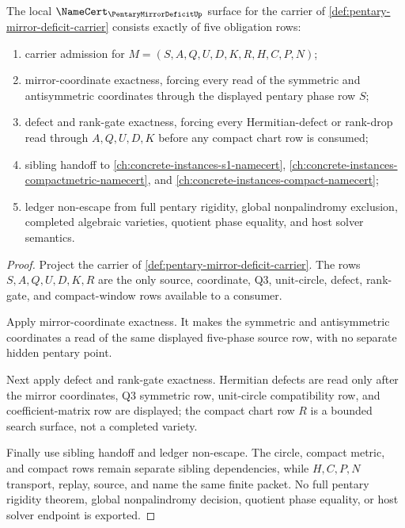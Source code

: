 \begin{theorem}
\label{thm:pentary-mirror-deficit-namecert-obligations}
The local $\NameCert_{\PentaryMirrorDeficitUp}$ surface for the carrier of \autoref{def:pentary-mirror-deficit-carrier} consists exactly of five obligation rows:
\begin{enumerate}
\item carrier admission for $M=(S,A,Q,U,D,K,R,H,C,P,N)$;
\item mirror-coordinate exactness, forcing every read of the symmetric and antisymmetric coordinates through the displayed pentary phase row $S$;
\item defect and rank-gate exactness, forcing every Hermitian-defect or rank-drop read through $A,Q,U,D,K$ before any compact chart row is consumed;
\item sibling handoff to \autoref{ch:concrete-instances-s1-namecert}, \autoref{ch:concrete-instances-compactmetric-namecert}, and \autoref{ch:concrete-instances-compact-namecert};
\item ledger non-escape from full pentary rigidity, global nonpalindromy exclusion, completed algebraic varieties, quotient phase equality, and host solver semantics.
\end{enumerate}
\end{theorem}
\begin{proof}
Project the carrier of \autoref{def:pentary-mirror-deficit-carrier}. The rows $S,A,Q,U,D,K,R$ are the only source, coordinate, Q3, unit-circle, defect, rank-gate, and compact-window rows available to a consumer.

Apply mirror-coordinate exactness. It makes the symmetric and antisymmetric coordinates a read of the same displayed five-phase source row, with no separate hidden pentary point.

Next apply defect and rank-gate exactness. Hermitian defects are read only after the mirror coordinates, Q3 symmetric row, unit-circle compatibility row, and coefficient-matrix row are displayed; the compact chart row $R$ is a bounded search surface, not a completed variety.

Finally use sibling handoff and ledger non-escape. The circle, compact metric, and compact rows remain separate sibling dependencies, while $H,C,P,N$ transport, replay, source, and name the same finite packet. No full pentary rigidity theorem, global nonpalindromy decision, quotient phase equality, or host solver endpoint is exported.
\end{proof}

